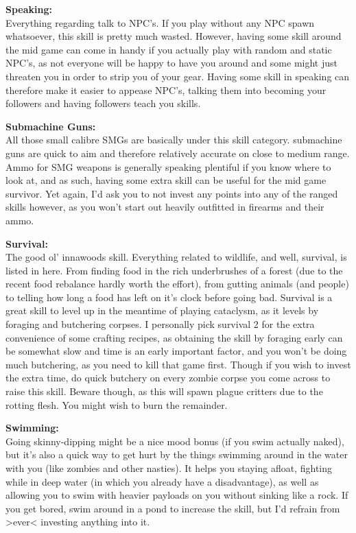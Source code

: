 \textbf{Speaking:}\\Everything regarding talk to NPC's. If you play without any NPC spawn whatsoever, this skill is pretty much wasted. However, having some skill around the mid game can come in handy if you actually play with random and static NPC's, as not everyone will be happy to have you around and some might just threaten you in order to strip you of your gear. Having some skill in speaking can therefore make it easier to appease NPC's, talking them into becoming your followers and having followers teach you skills.

\textbf{Submachine Guns:}\\All those small calibre SMGs are basically under this skill category. submachine guns are quick to aim and therefore relatively accurate on close to medium range. Ammo for SMG weapons is generally speaking plentiful if you know where to look at, and as such, having some extra skill can be useful for the mid game survivor. Yet again, I'd ask you to not invest any points into any of the ranged skills however, as you won't start out heavily outfitted in firearms and their ammo.

\textbf{Survival:}\\The good ol' innawoods skill. Everything related to wildlife, and well, survival, is listed in here. From finding food in the rich underbrushes of a forest (due to the recent food rebalance hardly worth the effort), from gutting animals (and people) to telling how long a food has left on it's clock before going bad. Survival is a great skill to level up in the meantime of playing cataclysm, as it levels by foraging and butchering corpses. I personally pick survival 2 for the extra convenience of some crafting recipes, as obtaining the skill by foraging early can be somewhat slow and time is an early important factor, and you won't be doing much butchering, as you need to kill that game first. Though if you wish to invest the extra time, do quick butchery on every zombie corpse you come across to raise this skill. Beware though, as this will spawn plague critters due to the rotting flesh. You might wish to burn the remainder.

\textbf{Swimming:}\\Going skinny-dipping might be a nice mood bonus (if you swim actually naked), but it's also a quick way to get hurt by the things swimming around in the water with you (like zombies and other nasties). It helps you staying afloat, fighting while in deep water (in which you already have a disadvantage), as well as allowing you to swim with heavier payloads on you without sinking like a rock. If you get bored, swim around in a pond to increase the skill, but I'd refrain from >ever< investing anything into it.

